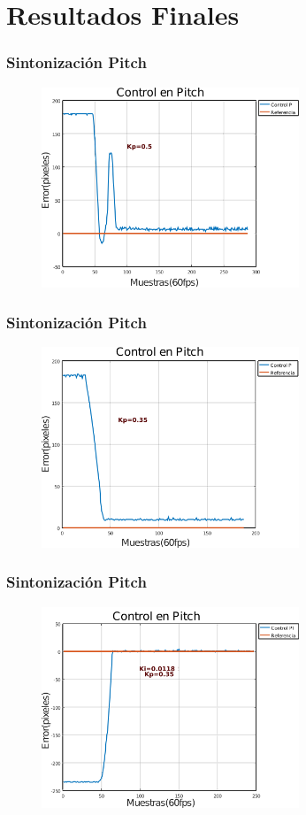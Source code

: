 \documentclass[11pt]{beamer}
\begin{document}
  \section{Resultados Finales}
  \begin{frame}
    \frametitle{Sintonización Pitch}
    \begin{figure}
      \includegraphics[height=6cm, keepaspectratio]{images/Sintonizacion-pitch.png}
    \end{figure}
  \end{frame}
  \begin{frame}
    \frametitle{Sintonización Pitch}
    \begin{figure}
      \includegraphics[height=6cm, keepaspectratio]{images/Sintonizacion-pitch1.png}
    \end{figure}
  \end{frame}
  \begin{frame}
    \frametitle{Sintonización Pitch}
    \begin{figure}
      \includegraphics[height=6cm, keepaspectratio]{images/Sintonizacion-pitch2.png}
    \end{figure}
  \end{frame}
\end{document}
